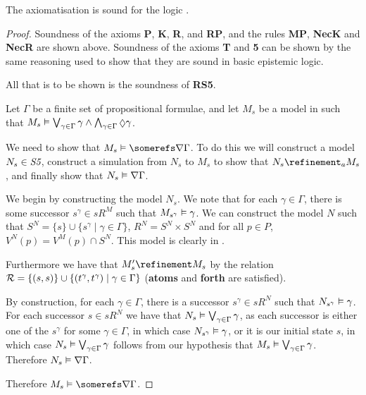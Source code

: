\begin{lemma}\label{single-sound-s5}
The axiomatisation \axiomSiF{} is sound for the logic \logicSiF{}.
\end{lemma}

\begin{proof}
Soundness of the axioms {\bf P}, {\bf K}, {\bf R}, and {\bf RP}, and the rules
{\bf MP}, {\bf NecK} and {\bf NecR} are shown above. Soundness of the axioms
{\bf T} and {\bf 5} can be shown by the same reasoning used to show that they
are sound in basic epistemic logic.

All that is to be shown is the soundness of {\bf RS5}.

Let $\Gamma$ be a finite set of propositional formulae, and let $M_s$ be a model in
\classS{} such that $M_s \entails \bigvee_{\gamma \in \Gamma} \gamma \land
\bigwedge_{\gamma \in \Gamma} \suspects \gamma$.

We need to show that $M_s \entails \somerefs \covers \Gamma$. To do this we will
construct a model $N_s \in \textit{S5}$, construct a simulation from $N_s$ to $M_s$
to show that $N_s \refinement_a M_s$, and finally show that $N_s \vDash
\nabla \Gamma$.

We begin by constructing the model $N_s$. We note that for each $\gamma \in
\Gamma$, there is some successor $s^\gamma \in sR^{M}$ such that $M_{s^\gamma}
\vDash \gamma$.  We can construct the model $N$ such that $S^{N} = \{s\} \cup
\{s^\gamma \mid \gamma \in \Gamma\}$, $R^{N} = S^{N} \times S^{N}$ and for all
$p \in P$, $V^{N}(p) = V^M(p) \cap S^{N}$. This model is clearly in \classS.

Furthermore we have that $M'_s \refinement M_s$ by the relation ${\cal
R} = \{(s, s)\} \cup \{(t^\gamma, t^\gamma) \mid \gamma \in \Gamma\}$
({\bf atoms} and {\bf forth} are satisfied). 

By construction, for each $\gamma \in \Gamma$, there is a successor $s^\gamma
\in sR^{N}$ such that $N_{s^\gamma} \vDash \gamma$. For each successor $s
\in sR^{N}$ we have that $N_s \vDash \bigvee_{\gamma \in \Gamma}
\gamma$, as each successor is either one of the $s^\gamma$ for some $\gamma \in
\Gamma$, in which case $N_{s^\gamma} \vDash \gamma$, or it is our initial
state $s$, in which case $N_s \vDash \bigvee_{\gamma \in \Gamma} \gamma$
follows from our hypothesis that $M_s \vDash \bigvee_{\gamma \in \Gamma}
\gamma$. Therefore $N_s \vDash \nabla \Gamma$.

Therefore $M_s \entails \somerefs \covers \Gamma$. 


\end{proof}
